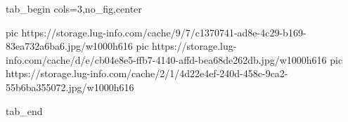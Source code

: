  
 
 
 
 


\ifcmt
  tab_begin cols=3,no_fig,center

     pic https://storage.lug-info.com/cache/9/7/c1370741-ad8e-4c29-b169-83ea732a6ba6.jpg/w1000h616
     pic https://storage.lug-info.com/cache/d/e/cb04e8e5-ffb7-4140-affd-bea68de262db.jpg/w1000h616
     pic https://storage.lug-info.com/cache/2/1/4d22e4ef-240d-458c-9ca2-55b6ba355072.jpg/w1000h616

  tab_end
\fi
